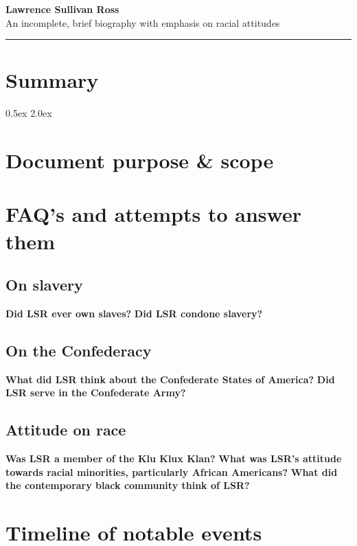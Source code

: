 \documentclass[12pt]{article}
\begin{document}
\Large{\textbf{Lawrence Sullivan Ross \\}}
\large{An incomplete, brief biography with emphasis on racial attitudes \\}
\rule{\textwidth}{1pt}

\section{Summary}

\parskip 0.5ex
\newpage
\tableofcontents
\parskip 2.0ex

\newpage
\section{Document purpose \& scope}

\newpage
\section{FAQ's and attempts to answer them}

\subsection{On slavery}
\textbf{Did LSR ever own slaves?}
\textbf{Did LSR condone slavery?}

\subsection{On the Confederacy}
\textbf{What did LSR think about the Confederate States of America?}
\textbf{Did LSR serve in the Confederate Army?}

\subsection{Attitude on race}
\textbf{Was LSR a member of the Klu Klux Klan?}
\textbf{What was LSR's attitude towards racial minorities, particularly African Americans?}
\textbf{What did the contemporary black community think of LSR?}


\newpage
\section{Timeline of notable events}
\end{document}
